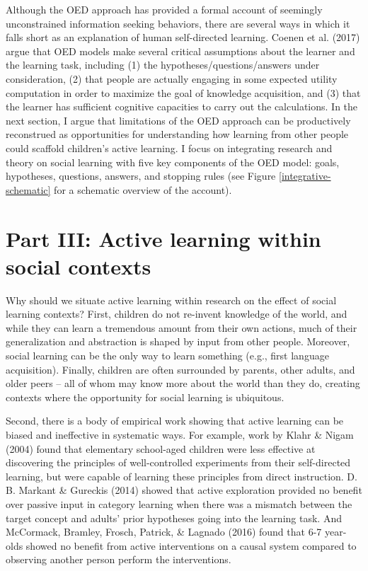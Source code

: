 \documentclass[oneside]{report}
\begin{document}
Although the OED approach has provided a formal account of seemingly
unconstrained information seeking behaviors, there are several ways in
which it falls short as an explanation of human self-directed learning.
Coenen et al. (2017) argue that OED models make several critical
assumptions about the learner and the learning task, including (1) the
hypotheses/questions/answers under consideration, (2) that people are
actually engaging in some expected utility computation in order to
maximize the goal of knowledge acquisition, and (3) that the learner has
sufficient cognitive capacities to carry out the calculations. In the
next section, I argue that limitations of the OED approach can be
productively reconstrued as opportunities for understanding how learning
from other people could scaffold children's active learning. I focus on
integrating research and theory on social learning with five key
components of the OED model: goals, hypotheses, questions, answers, and
stopping rules (see Figure \ref{integrative-schematic} for a schematic
overview of the account).

\hypertarget{active_social}{\section{Part III: Active learning within
social contexts}\label{active_social}}

Why should we situate active learning within research on the effect of
social learning contexts? First, children do not re-invent knowledge of
the world, and while they can learn a tremendous amount from their own
actions, much of their generalization and abstraction is shaped by input
from other people. Moreover, social learning can be the only way to
learn something (e.g., first language acquisition). Finally, children
are often surrounded by parents, other adults, and older peers -- all of
whom may know more about the world than they do, creating contexts where
the opportunity for social learning is ubiquitous.

Second, there is a body of empirical work showing that active learning
can be biased and ineffective in systematic ways. For example, work by
Klahr \& Nigam (2004) found that elementary school-aged children were
less effective at discovering the principles of well-controlled
experiments from their self-directed learning, but were capable of
learning these principles from direct instruction. D. B. Markant \&
Gureckis (2014) showed that active exploration provided no benefit over
passive input in category learning when there was a mismatch between the
target concept and adults' prior hypotheses going into the learning
task. And McCormack, Bramley, Frosch, Patrick, \& Lagnado (2016) found
that 6-7 year-olds showed no benefit from active interventions on a
causal system compared to observing another person perform the
interventions.
\end{document}
